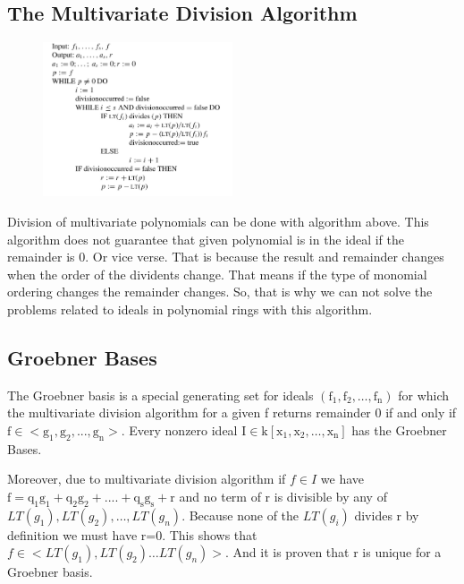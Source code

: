 \documentclass[11pt]{article}
\begin{document}
\subsection{The Multivariate Division Algorithm}
\begin{figure}[H]
  \begin{center}
    \includegraphics[width=0.50\textwidth]{MultivariateDivisionAlgorithm.jpg}
    \caption{}
    \label{fig: }
  \end{center}
\end{figure}

Division of multivariate polynomials can be done with algorithm above. This algorithm does not guarantee that given polynomial is in the ideal if the remainder is 0. Or vice verse. That is because the result and remainder changes when the order of the dividents change. That means if the type of monomial ordering changes the remainder changes. So, that is why we can not solve the problems related to ideals in polynomial rings with this algorithm.

\subsection{Groebner Bases}

The Groebner basis is a special generating set for ideals $\mathrm{(f_1,f_2,\ldots,f_n)}$ for which the multivariate division algorithm for a given f returns remainder 0 if and only if $\mathrm{f \in <g_1,g_2,...,g_n>}$. Every nonzero ideal $\mathrm{I \in k[x_1,x_2,\ldots,x_n]}$ has the Groebner Bases. 

Moreover, due to multivariate division algorithm if $f \in I$ we have $\mathrm{f=q_1g_1 + q_2g_2 + .... + q_sg_s + r}$
and no term of r is divisible by any of $LT(g_1),LT(g_2),\ldots,LT(g_n)$. Because none of the $LT(g_i)$ divides r by definition we must have r=0. This shows that $f \in <LT(g_1),LT(g_2) \ldots LT(g_n)>$. And it is proven that r is unique for a Groebner basis.\\
\end{document}
